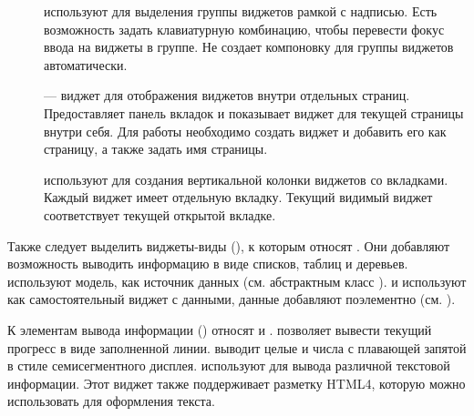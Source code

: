 \begin{description}
\item[] используют для выделения группы виджетов рамкой с надписью. Есть возможность задать
клавиатурную комбинацию, чтобы перевести фокус ввода на виджеты в группе. Не создает компоновку для группы виджетов
автоматически.
\item[] --- виджет для отображения виджетов внутри отдельных страниц. Предоставляет панель
вкладок и показывает виджет для текущей страницы внутри себя. Для работы необходимо создать виджет и добавить его как
страницу, а также задать имя страницы.
\item[] используют для создания вертикальной колонки виджетов со вкладками. Каждый виджет имеет
отдельную вкладку. Текущий видимый виджет соответствует текущей открытой вкладке. 
\end{description}

Также следует выделить виджеты-виды (), к которым относят .
 Они добавляют возможность выводить информацию в виде
списков, таблиц и деревьев.   используют модель, 
как источник данных (см. абстрактным
класс  ).   и   
используют как самостоятельный виджет с данными,
данные добавляют поэлементно (см.  ). 

К элементам вывода информации () относят
 и .
 позволяет вывести текущий
прогресс в виде заполненной линии. 
выводит целые и числа с плавающей запятой в стиле семисегментного дисплея.
 используют для вывода различной текстовой
информации. Этот виджет также поддерживает разметку HTML4, которую можно использовать для оформления текста.

